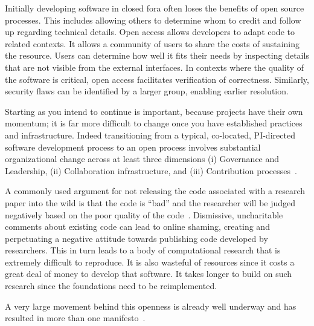\documentclass[a4paper,UKenglish]{dagman}
\begin{document}
Initially developing software in closed fora often loses the benefits of open source processes. This includes allowing others to determine whom to credit and follow up regarding technical details. Open access allows developers to adapt code to related contexts. It allows a community of users to share the costs of sustaining the resource. Users can determine how well it fits their needs by inspecting details that are not visible from the external interfaces. In contexts where the quality of the software is critical, open access facilitates verification of correctness. Similarly, security flaws can be identified by a larger group, enabling earlier resolution.

Starting as you intend to continue is important, because projects have their own momentum; it is far more difficult to change once you have established practices and infrastructure. Indeed transitioning from a typical, co-located, PI-directed software development process to an open process involves substantial organizational change across at least three dimensions (i) Governance and Leadership, (ii) Collaboration infrastructure, and (iii) Contribution processes~\cite{howison2014collaboration}.

A commonly used argument for not releasing the code associated with a research paper into the wild is that the code is ``bad'' and the researcher will be judged negatively based on the poor quality of the code~\cite{jay_git_jors}.
Dismissive, uncharitable comments about existing code can lead to online shaming, creating and perpetuating a negative attitude towards publishing code developed by researchers.
This in turn leads to a body of computational research that is extremely difficult to reproduce. It is also wasteful of resources since it costs a great deal of money to develop that software. It takes longer to build on such research since the foundations need to be reimplemented.

A very large movement behind this openness is already well underway and has resulted in more than one manifesto~\cite{barba_reproducibility_2012,alex_holcombe_open_2011}.
\end{document}
